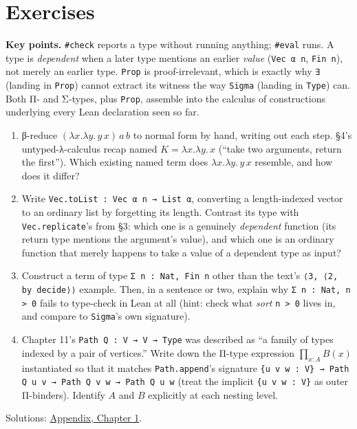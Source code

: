 \section{Exercises}\label{sec:01-basics:06-exercises:1}

\textbf{Key points.} \texttt{\#check} reports a type without running anything; \texttt{\#eval} runs. A type is \emph{dependent} when a later type mentions an earlier \emph{value} (\texttt{Vec α n}, \texttt{Fin n}), not merely an earlier type. \texttt{Prop} is proof-irrelevant, which is exactly why \texttt{∃} (landing in \texttt{Prop}) cannot extract its witness the way \texttt{Sigma} (landing in \texttt{Type}) can. Both Π- and Σ-types, plus \texttt{Prop}, assemble into the calculus of constructions underlying every Lean declaration seen so far.

\begin{enumerate}
\def\labelenumi{\arabic{enumi}.}
\tightlist
\item
  β-reduce \((\lambda x.\lambda y.\, y\, x)\, a\, b\) to normal form by hand, writing out each step. §4's untyped-λ-calculus recap named \(K = \lambda x.\lambda y.\, x\) (``take two arguments, return the first''). Which existing named term does \(\lambda x.\lambda y.\, y\, x\) resemble, and how does it differ?
\item
  Write \texttt{Vec.toList : Vec α n → List α}, converting a length-indexed vector to an ordinary list by forgetting its length. Contrast its type with \texttt{Vec.replicate}'s from §3: which one is a genuinely \emph{dependent} function (its return type mentions the argument's value), and which one is an ordinary function that merely happens to take a value of a dependent type as input?
\item
  Construct a term of type \texttt{Σ n : Nat, Fin n} other than the text's \texttt{⟨3, ⟨2, by decide⟩⟩} example. Then, in a sentence or two, explain why \texttt{Σ n : Nat, n > 0} fails to type-check in Lean at all (hint: check what \emph{sort} \texttt{n > 0} lives in, and compare to \texttt{Sigma}'s own signature).
\item
  Chapter 11's \texttt{Path Q : V → V → Type} was described as ``a family of types indexed by a pair of vertices.'' Write down the Π-type expression \(\prod_{x:A} B(x)\) instantiated so that it matches \texttt{Path.append}'s signature \texttt{\{u v w : V\} → Path Q u v → Path Q v w → Path Q u w} (treat the implicit \texttt{\{u v w : V\}} as outer Π-binders). Identify \(A\) and \(B\) explicitly at each nesting level.
\end{enumerate}

Solutions: \hyperref[sec:14-appendix-solutions:01-chapter-1:1]{Appendix, Chapter 1}.
